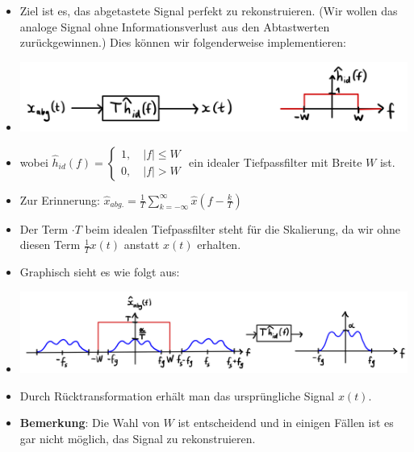 \documentclass[11pt]{article}
\begin{document}
\begin{itemize}[leftmargin = 0pt]
    \item[] Ziel ist es, das abgetastete Signal perfekt zu rekonstruieren. (Wir wollen das analoge Signal ohne Informationsverlust aus den Abtastwerten zurückgewinnen.) Dies können wir folgenderweise implementieren:
    \vspace*{-0.5cm}
    \item[] \begin{center}
        \includegraphics[width=0.65\linewidth]{docimgs/filtering3.jpg}
    \end{center}
    \item[] wobei $\hat{h}_{id}(f) = \displaystyle\begin{cases}
        1, \hspace{12pt} |f|\leq W \\
        0, \hspace{12pt} |f|> W
    \end{cases}$ ein idealer Tiefpassfilter mit Breite $W$ ist.
    \item[] Zur Erinnerung: $\hat{x}_{abg.} = \displaystyle\frac{1}{T} \displaystyle\sum_{k = -\infty}^\infty \hat{x}\left( f- \frac{k}{T} \right)$
    \item[] Der Term $\cdot T$ beim idealen Tiefpassfilter steht für die Skalierung, da wir ohne diesen Term $\frac{1}{T}x(t)$ anstatt $x(t)$ erhalten.
    \item[] Graphisch sieht es wie folgt aus:
    \item[] \begin{center}
        \includegraphics[width=0.9\linewidth]{docimgs/filtering1.jpg}
    \end{center}
    \item[] Durch Rücktransformation erhält man das ursprüngliche Signal $x(t)$.
    \item[] \textbf{Bemerkung}: Die Wahl von $W$ ist entscheidend und in einigen Fällen ist es gar nicht möglich, das Signal zu rekonstruieren.
\end{itemize}
\end{document}
